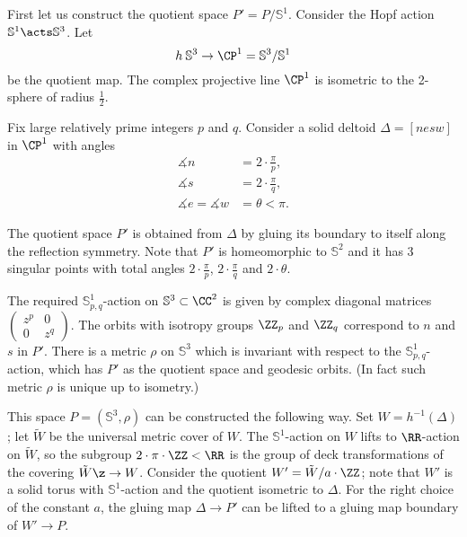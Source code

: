 First let us construct the quotient space $P'=P/\mathbb S^1$.
Consider the Hopf action $\mathbb S^1\acts\mathbb S^3$.
Let 
\[h\:\mathbb S^3\to\CP^1=\mathbb S^3/\mathbb S^1\] 
be the quotient map.
The complex projective line $\CP^1$ is isometric to the 2-sphere of radius $\tfrac12$.

Fix large relatively prime integers $p$ and $q$. 
Consider a solid deltoid $\Delta=[nesw]$ in $\CP^1$ with angles 
\begin{align*}
\measuredangle n&=2 \cdot\tfrac\pi p,
\\
\measuredangle s&=2\cdot\tfrac\pi q,
\\
\measuredangle e=\measuredangle w&=\theta<\pi.
\end{align*}

The quotient space $P'$ is obtained from $\Delta$ by gluing its boundary to itself along the reflection symmetry.
Note that $P'$ is homeomorphic to $\mathbb S^2$ and
it has 3 singular points with total angles $2\cdot\tfrac\pi p$,
$2\cdot\tfrac\pi q$ and $2\cdot\theta$.

The required $\mathbb S^1_{p,q}$-action on $\mathbb{S}^3\subset\CC^2$ is given by complex diagonal matrices $\left(\begin{smallmatrix}z^p&0\\0&z^q\end{smallmatrix}\right)$.
The orbits with isotropy groups $\ZZ_p$ and $\ZZ_q$ correspond to $n$ and $s$ in $P'$.
There is a metric $\rho$ on  $\mathbb{S}^3$ which is invariant with respect to the $\mathbb S^1_{p,q}$-action, which has $P'$  as the quotient space and geodesic orbits. 
(In fact such metric $\rho$ is unique up to isometry.)

This space $P=(\mathbb{S}^3,\rho)$ can be constructed the following way.
Set $W=h^{-1}(\Delta)$;
let $\tilde W$ be the universal metric cover of $W$.
The $\mathbb{S}^1$-action on $W$ lifts to $\RR$-action on $\tilde W$,
so the subgroup $2\cdot\pi\cdot\ZZ<\RR$ is the group of deck transformations of the covering $\tilde W\z\to W$. 
Consider the quotient $W'=\tilde W/a\cdot\ZZ$;
note that $W'$ is a solid torus with $\mathbb{S}^1$-action and the quotient isometric to $\Delta$.
For the right choice of the constant $a$, the gluing map $\Delta\to P'$ can be lifted to a gluing map boundary of $W'\to P$.



